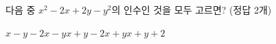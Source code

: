 다음 중 $x^2-2x+2y-y^2$의 인수인 것을 모두 고르면? (정답 2개)
\begin{choices32}{$x-y-2$}{$x-y$}{$x+y-2$}{$x+y$}{$x+y+2$}\end{choices32}
